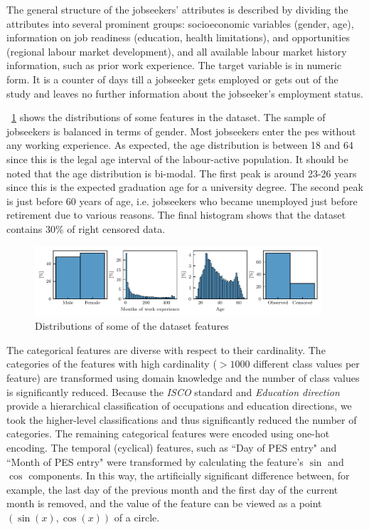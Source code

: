 \documentclass[3p,review,authoryear]{elsarticle}
\begin{document}
The general structure of the jobseekers' attributes is described by dividing the attributes into several prominent groups: socioeconomic variables (gender, age), information on job readiness (education, health limitations), and opportunities (regional labour market development), and all available labour market history information, such as prior work experience.
The target variable is in numeric form.
It is a counter of days till a jobseeker gets employed or gets out of the study and leaves no further information about the jobseeker's employment status.

\figurename~\ref{fig:grid_prob} shows the distributions of some features in the dataset.
The sample of jobseekers is balanced in terms of gender.
Most jobseekers enter the \gls{pes} without any working experience. 
As expected, the age distribution is between 18 and 64 since this is the legal age interval of the labour-active population.
It should be noted that the age distribution is bi-modal.
The first peak is around 23-26 years since this is the expected graduation age for a university degree.
The second peak is just before 60 years of age, i.e. jobseekers who became unemployed just before retirement due to various reasons.
The final histogram shows that the dataset contains 30\% of right censored data.

\begin{figure}[h!]
    \centering
    \includegraphics[width=0.95\textwidth]{feature_distributions.pdf}
    \caption{Distributions of some of the dataset features \citep{Andonovikj_2024}}
    \label{fig:grid_prob}
\end{figure}


The categorical features are diverse with respect to their cardinality.
The categories of the features with high cardinality ($>1000$ different class values per feature) are transformed using domain knowledge and the number of class values is significantly reduced.
Because the \emph{ISCO} standard and \emph{Education direction} provide a hierarchical classification of occupations and education directions, we took the higher-level classifications and thus significantly reduced the number of categories.
The remaining categorical features were encoded using one-hot encoding.
The temporal (cyclical) features, such as ``Day of PES entry" and ``Month of PES entry" were transformed by calculating the feature's $\sin$ and $\cos$ components.
In this way, the artificially significant difference between, for example, the last day of the previous month and the first day of the current month is removed, and the value of the feature can be viewed as a point $\left(\sin(x), \cos(x)\right)$ of a circle.
\end{document}

